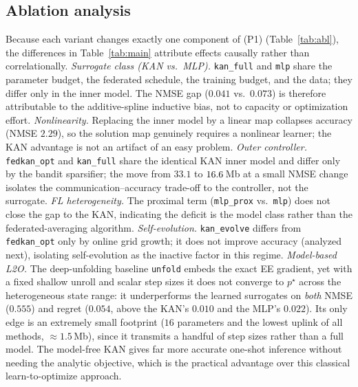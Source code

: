 \documentclass[journal]{IEEEtran}
\newcommand{\pstar}{p^{\star}}
\newcommand{\KFnmse}{0.041}\newcommand{\KFnmsesd}{0.012}
\newcommand{\KFreg}{0.010}\newcommand{\KFbits}{33.1}
\newcommand{\MLnmse}{0.073}\newcommand{\MLnmsesd}{0.040}
\newcommand{\MLreg}{0.022}\newcommand{\MLbits}{33.2}\newcommand{\MLpar}{361}
\newcommand{\LInmse}{2.29}\newcommand{\LIreg}{0.30}
\newcommand{\UNnmse}{0.555}\newcommand{\UNreg}{0.054}
\newcommand{\UNbits}{1.5}\newcommand{\UNpar}{16}
\begin{document}
\subsection{Ablation analysis}
Because each variant changes exactly one component of (P1) (Table~\ref{tab:abl}),
the differences in Table~\ref{tab:main} attribute effects causally rather than
correlationally.
\emph{Surrogate class (KAN vs.\ MLP).} \texttt{kan\_full} and \texttt{mlp} share the
parameter budget, the federated schedule, the training budget, and the data; they
differ only in the inner model. The NMSE gap ($\KFnmse$ vs.\ $\MLnmse$) is therefore
attributable to the additive-spline inductive bias, not to capacity or optimization
effort.
\emph{Nonlinearity.} Replacing the inner model by a linear map collapses accuracy
(NMSE $\LInmse$), so the solution map genuinely requires a nonlinear learner; the
KAN advantage is not an artifact of an easy problem.
\emph{Outer controller.} \texttt{fedkan\_opt} and \texttt{kan\_full} share the
identical KAN inner model and differ only by the bandit sparsifier; the move from
$\KFbits$ to $16.6$\,Mb at a small NMSE change isolates the
communication--accuracy trade-off to the controller, not the surrogate.
\emph{FL heterogeneity.} The proximal term (\texttt{mlp\_prox} vs.\ \texttt{mlp})
does not close the gap to the KAN, indicating the deficit is the model class rather
than the federated-averaging algorithm.
\emph{Self-evolution.} \texttt{kan\_evolve} differs from \texttt{fedkan\_opt} only by
online grid growth; it does not improve accuracy (analyzed next), isolating
self-evolution as the inactive factor in this regime.
\emph{Model-based L2O.} The deep-unfolding baseline \texttt{unfold} embeds the exact
EE gradient, yet with a fixed shallow unroll and scalar step sizes it does not
converge to $\pstar$ across the heterogeneous state range: it underperforms the
learned surrogates on \emph{both} NMSE ($\UNnmse$) and regret ($\UNreg$, above the
KAN's $\KFreg$ and the MLP's $\MLreg$). Its only edge is an extremely small
footprint ($\UNpar$ parameters and the lowest uplink of all methods,
$\approx\!\UNbits$\,Mb), since it transmits a handful of step sizes rather than a
full model. The model-free KAN gives far more accurate one-shot inference without
needing the analytic objective, which is the practical advantage over this classical
learn-to-optimize approach.
\end{document}
